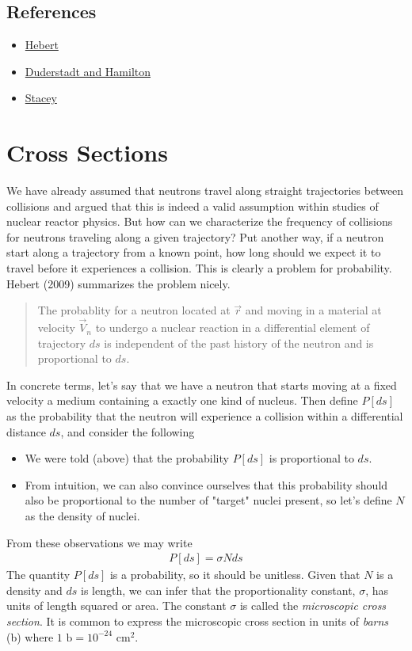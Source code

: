 \documentclass[11pt]{article}
\begin{document}
\subsection{References}
\label{sec:orgheadline10}
\begin{itemize}
\item \href{Hebert2009}{Hebert}
\item \href{Duderstadt:Hamilton1976}{Duderstadt and Hamilton}
\item \href{Stacey2001}{Stacey}
\end{itemize}
\section{Cross Sections}
\label{sec:orgheadline13}
We have already assumed that neutrons travel along straight trajectories between collisions and argued that this is indeed a valid assumption within studies of nuclear reactor physics.  But how can we characterize the frequency of collisions for neutrons traveling along a given trajectory?  Put another way, if a neutron start along a trajectory from a known point, how long should we expect it to travel before it experiences a collision.  This is clearly a problem for probability.  Hebert (2009) summarizes the problem nicely.

\begin{quote}
The probablity for a neutron located at \(\vec{r}\) and moving in a material at velocity \(\vec{V}_n\) to undergo a nuclear reaction in a differential element of trajectory \(ds\) is independent of the past history of the neutron and is proportional to \(ds\).
\end{quote}

In concrete terms, let's say that we have a  neutron that starts moving at a fixed velocity a medium  containing a exactly one kind of nucleus.  Then define \(P[ds]\) as the probability that the neutron will experience a collision within a differential distance \(ds\), and consider the following
\begin{itemize}
\item We were told (above) that the probability \(P[ds]\) is proportional to \(ds\).
\item From intuition, we can also convince ourselves that this probability should also be proportional to the number of "target" nuclei present, so let's define \(N\) as the density of nuclei.
\end{itemize}
From these observations we may write
\begin{align*}
  P[ds] = \sigma N ds
\end{align*}
The quantity \(P[ds]\) is a probability, so it should be unitless.  Given that \(N\) is a density and \(ds\) is length, we can infer that the proportionality constant, \(\sigma\), has units of length squared or area.  The constant \(\sigma\) is called the \emph{microscopic cross section}.  It is common to express the microscopic cross section in units of \emph{barns} (b) where \(1 \text{ b} = 10^{-24} \text{ cm}^2\).
\end{document}
